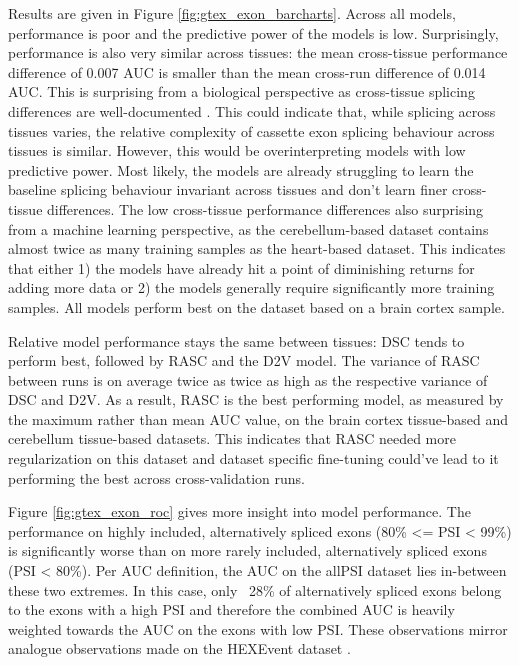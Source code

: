 Results are given in Figure \ref{fig:gtex_exon_barcharts}. Across all models, performance is poor and the predictive power of the models is low. Surprisingly, performance is also very similar across tissues: the mean cross-tissue performance difference of 0.007 AUC is smaller than the mean cross-run difference of 0.014 AUC. This is surprising from a biological perspective as cross-tissue splicing differences are well-documented \cite{crosstissuesplicing}. 
This could indicate that, while splicing across tissues varies, the relative complexity of cassette exon splicing behaviour across tissues is similar. However, this would be overinterpreting models with low predictive power.
Most likely, the models are already struggling to learn the baseline splicing behaviour invariant across tissues and don't learn finer cross-tissue differences. 
The low cross-tissue performance differences also surprising from a machine learning perspective, as the cerebellum-based dataset contains almost twice as many training samples as the heart-based dataset. This indicates that either 1) the models have already hit a point of diminishing returns for adding more data or 2) the models generally require significantly more training samples. All models perform best on the dataset based on a brain cortex sample. %

Relative model performance stays the same between tissues: DSC tends to perform best, followed by RASC and the D2V model. The variance of RASC between runs is on average twice as twice as high as the respective variance of DSC and D2V. As a result, RASC is the best performing model, as measured by the maximum rather than mean AUC value, on the brain cortex tissue-based and cerebellum tissue-based datasets. This indicates that RASC needed more regularization on this dataset and dataset specific fine-tuning could've lead to it performing the best across cross-validation runs.

Figure \ref{fig:gtex_exon_roc} gives more insight into model performance. 
The performance on highly included, alternatively spliced exons (80\% <= PSI < 99\%) is significantly worse than on more rarely included, alternatively spliced exons (PSI < 80\%). Per AUC definition, the AUC on the allPSI dataset lies in-between these two extremes. In this case, only ~28\% of alternatively spliced exons belong to the exons with a high PSI and therefore the combined AUC is heavily weighted towards the AUC on the exons with low PSI. These observations mirror analogue observations made on the HEXEvent dataset \cite{dsc}.

